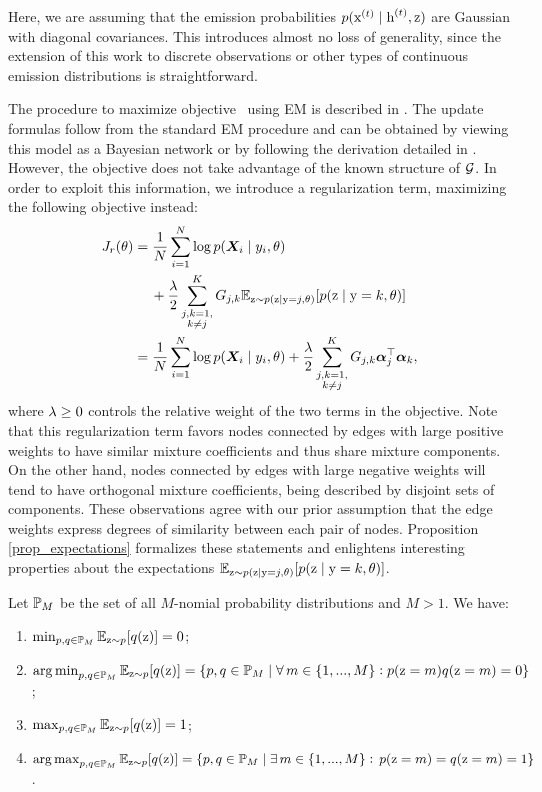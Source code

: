 Here, we are assuming that the emission probabilities $p({\textnormal{x}}^{(t)}\mid{\textnormal{h}}^{(t)},{\textnormal{z}})$ are Gaussian with diagonal covariances. This introduces almost no loss of generality, since the extension of this work to discrete observations or other types of continuous emission distributions is straightforward.

The procedure to maximize objective~ using EM is described in . The update formulas follow from the standard EM procedure and can be obtained by viewing this model as a Bayesian network or by following the derivation detailed in . However, the objective  does not take advantage of the known structure of ${\mathcal{G}}$. In order to exploit this information, we introduce a regularization term, maximizing the following objective instead:
\begin{align}
\label{objective}
J_r(\theta) &= \frac{1}{N}\sum_{i=1}^N \log p({\bm{X}}_i \mid y_i, \theta) \nonumber\\ 
&\mathbin{\hphantom{=}}{}+ \frac{\lambda}{2} \sum_{\substack{j,k=1,\\k\neq j}}^{K} {G}_{j,k} \mathbb{E}_{{\textnormal{z}} \sim p({\textnormal{z}} \mid {\textnormal{y}}=j, \theta)} [ p({\textnormal{z}} \mid {\textnormal{y}}=k, \theta) ] \nonumber\\
&= \frac{1}{N}\sum_{i=1}^N \log p({\bm{X}}_i \mid y_i, \theta) + \frac{\lambda}{2} \sum_{\substack{j,k=1,\\k\neq j}}^{K} {G}_{j,k} {\bm{\alpha}}_j^\top {\bm{\alpha}}_k,
\end{align}
where $\lambda \geq 0$ controls the relative weight of the two terms in the objective. Note that this regularization term favors nodes connected by edges with large positive weights to have similar mixture coefficients and thus share mixture components. On the other hand, nodes connected by edges with large negative weights will tend to have orthogonal mixture coefficients, being described by disjoint sets of components. These observations agree with our prior assumption that the edge weights express degrees of similarity between each pair of nodes. Proposition \ref{prop_expectations} formalizes these statements and enlightens interesting properties about the expectations $\mathbb{E}_{{\textnormal{z}} \sim p({\textnormal{z}} \mid {\textnormal{y}}=j, \theta)} [ p({\textnormal{z}} \mid {\textnormal{y}}=k, \theta)]$.
\begin{proposition}
	\label{prop_expectations}
	Let ${\mathbb{P}}_M$ be the set of all $M$-nomial probability distributions and $M>1$. We have:
	\begin{enumerate}
		\item $\min_{p,q \in {\mathbb{P}}_M} \mathbb{E}_{{\textnormal{z}}\sim p} [ q({\textnormal{z}}) ] = 0$; \label{prop_min}
		\item $\operatorname*{arg\,min}_{p,q \in {\mathbb{P}}_M} \mathbb{E}_{{\textnormal{z}}\sim p} [ q({\textnormal{z}}) ] = \{p,q \in {\mathbb{P}}_M \mid \forall \, m \in \{1,...,M\}: p({\textnormal{z}} = m)q({\textnormal{z}} = m)=0\}$; \label{prop_argmin}
		\item $\max_{p,q \in {\mathbb{P}}_M} \mathbb{E}_{{\textnormal{z}}\sim p} [ q({\textnormal{z}}) ] = 1$; \label{prop_max}
		\item $\operatorname*{arg\,max}_{p,q \in {\mathbb{P}}_M} \mathbb{E}_{{\textnormal{z}}\sim p} [ q({\textnormal{z}}) ] = \{p,q \in {\mathbb{P}}_M \mid \exists \, m \in \{1,...,M\} : \, p({\textnormal{z}} = m)=q({\textnormal{z}} = m)=1\}$ \label{prop_argmax}.
	\end{enumerate}
\end{proposition}
